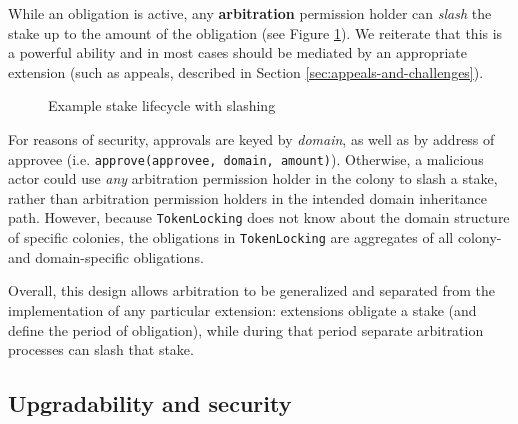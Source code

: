 While an obligation is active, any \textbf{arbitration} permission holder can \textit{slash} the stake up to the amount of the obligation (see Figure \ref{fig:stake-slash}). We reiterate that this is a powerful ability and in most cases should be mediated by an appropriate extension (such as appeals, described in Section \ref{sec:appeals-and-challenges}).

\begin{figure}[h]
    \centering
{}
 \caption{Example stake lifecycle with slashing}
 \label{fig:stake-slash}
\end{figure}

For reasons of security, approvals are keyed by \textit{domain}, as well as by address of approvee (i.e. \texttt{approve(approvee, domain, amount)}). Otherwise, a malicious actor could use \textit{any} arbitration permission holder in the colony to slash a stake, rather than arbitration permission holders in the intended domain inheritance path. However, because \texttt{TokenLocking} does not know about the domain structure of specific colonies, the obligations in \texttt{TokenLocking} are aggregates of all colony- and domain-specific obligations.

Overall, this design allows arbitration to be generalized and separated from the implementation of any particular extension: extensions obligate a stake (and define the period of obligation), while during that period separate arbitration processes can slash that stake.

\subsection{Upgradability and security}\label{subsec:upgradability}\label{sec:escape-hatches}

